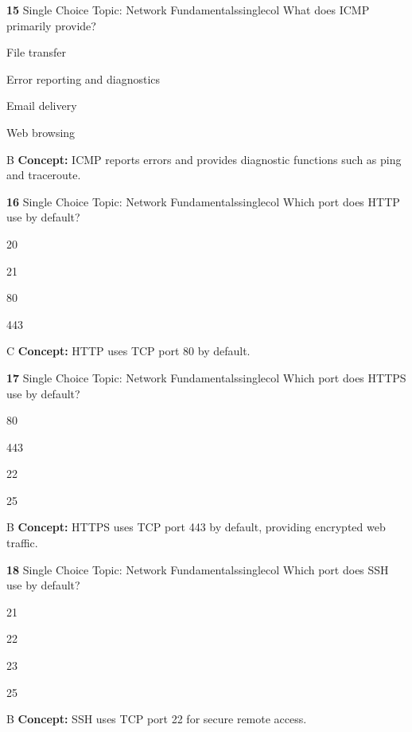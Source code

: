\documentclass[10pt,a4paper]{article}
\begin{document}
\begin{qcard}{\color{white}\textbf{15} \hfill \small Single Choice \textbar{} Topic: Network Fundamentals}{singlecol}
What does ICMP primarily provide?

\begin{qoptions}
\item File transfer
\item Error reporting and diagnostics
\item Email delivery
\item Web browsing
\end{qoptions}
\begin{explainbox}{B}
\textbf{Concept:} ICMP reports errors and provides diagnostic functions such as ping and traceroute.
\end{explainbox}
\end{qcard}

\begin{qcard}{\color{white}\textbf{16} \hfill \small Single Choice \textbar{} Topic: Network Fundamentals}{singlecol}
Which port does HTTP use by default?

\begin{qoptions}
\item 20
\item 21
\item 80
\item 443
\end{qoptions}
\begin{explainbox}{C}
\textbf{Concept:} HTTP uses TCP port 80 by default.
\end{explainbox}
\end{qcard}

\begin{qcard}{\color{white}\textbf{17} \hfill \small Single Choice \textbar{} Topic: Network Fundamentals}{singlecol}
Which port does HTTPS use by default?

\begin{qoptions}
\item 80
\item 443
\item 22
\item 25
\end{qoptions}
\begin{explainbox}{B}
\textbf{Concept:} HTTPS uses TCP port 443 by default, providing encrypted web traffic.
\end{explainbox}
\end{qcard}

\begin{qcard}{\color{white}\textbf{18} \hfill \small Single Choice \textbar{} Topic: Network Fundamentals}{singlecol}
Which port does SSH use by default?

\begin{qoptions}
\item 21
\item 22
\item 23
\item 25
\end{qoptions}
\begin{explainbox}{B}
\textbf{Concept:} SSH uses TCP port 22 for secure remote access.
\end{explainbox}
\end{qcard}
\end{document}
